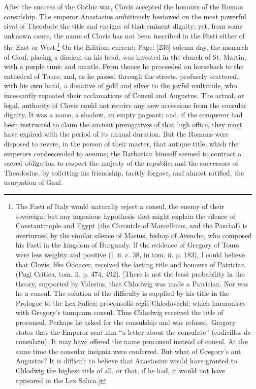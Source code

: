After the success of the Gothic war, Clovis accepted the honours of the Roman consulship. The emperor Anastasius ambitiously bestowed on the most powerful rival of Theodoric the title and ensigns of that eminent dignity; yet, from some unknown cause, the name of Clovis has not been inscribed in the Fasti either of the East or West.\footnote{The Fasti of Italy would naturally reject a consul, the enemy of their sovereign; but any ingenious hypothesis that might explain the silence of Constantinople and Egypt (the Chronicle of Marcellinus, and the Paschal) is overturned by the similar silence of Marius, bishop of Avenche, who composed his Fasti in the kingdom of Burgundy. If the evidence of Gregory of Tours were less weighty and positive (l. ii. c. 38, in tom. ii. p. 183), I could believe that Clovis, like Odoacer, received the lasting title and honours of Patrician (Pagi Critica, tom. ii. p. 474, 492). [There is not the least probability in the theory, supported by Valesius, that Chlodwig was made a Patrician. Nor was he a consul. The solution of the difficulty is supplied by his title in the Prologue to the Lex Salica: proconsolis regis Chlodovechi; which harmonises with Gregory\texthebrew{}’s tamquam consul. Thus Chlodwig received the title of proconsul. Perhaps he asked for the consulship and was refused. Gregory states that the Emperor sent him \texthebrew{“}a letter about the consulate\texthebrew{}” (codicillos de consulatu). It may have offered the name proconsul instead of consul. At the same time the consular insignia were conferred. But what of Gregory\texthebrew{}’s aut Augustus? It is difficult to believe that Anastasius would have granted to Chlodwig the highest title of all, or that, if he had, it would not have appeared in the Lex Salica.]} On the Edition: current; Page: [236] solemn day, the monarch of Gaul, placing a diadem on his head, was invested in the church of St. Martin, with a purple tunic and mantle. From thence he proceeded on horseback to the cathedral of Tours; and, as he passed through the streets, profusely scattered, with his own hand, a donative of gold and silver to the joyful multitude, who incessantly repeated their acclamations of Consul and Augustus. The actual, or legal, authority of Clovis could not receive any new accessions from the consular dignity. It was a name, a shadow, an empty pageant; and, if the conqueror had been instructed to claim the ancient prerogatives of that high office, they must have expired with the period of its annual duration. But the Romans were disposed to revere, in the person of their master, that antique title, which the emperors condescended to assume; the Barbarian himself seemed to contract a sacred obligation to respect the majesty of the republic; and the successors of Theodosius, by soliciting his friendship, tacitly forgave, and almost ratified, the usurpation of Gaul.

